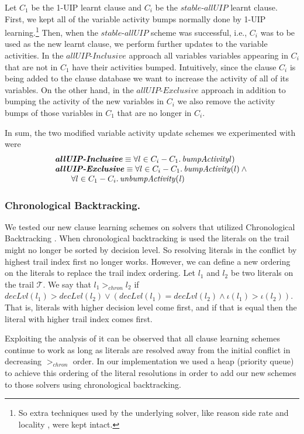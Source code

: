 \documentclass[runningheads]{llncs}
\newcommand{\allUip}{\textit{stable-allUIP}}
\newcommand{\allUipIn}{\textit{allUIP-Inclusive}}
\newcommand{\allUipEx}{\textit{allUIP-Exclusive}}
\newcommand{\trail}{\ensuremath{\mathcal{T}}}
\newcommand{\trailIdx}[1]{\ensuremath{\iota(#1)}}
\newcommand{\dlevel}[1]{\ensuremath{\mathit{decLvl}(#1)}}
\begin{document}
Let $C_1$ be the 1-UIP learnt clause and $C_i$ be the $\allUip$ learnt
clause. First, we kept all of the variable activity bumps normally
done by 1-UIP learning.\footnote{So extra techniques used by the
  underlying solver, like reason side rate and locality
  \cite{DBLP:conf/sat/LiangGPC16}, were kept intact.}  Then, when the
$\allUip$ scheme was successful, i.e., $C_i$ was to be used as the new
learnt clause, we perform further updates to the variable
activities. In the $\allUipIn$ approach all variables variables
appearing in $C_i$ that are not in $C_1$ have their activities
bumped. Intuitively, since the clause $C_i$ is being added to the
clause database we want to increase the activity of all of its
variables. On the other hand, in the $\allUipEx$ approach in addition
to bumping the activity of the new variables in $C_i$ we also remove
the activity bumps of those variables in $C_1$ that are no longer in
$C_i$.

In sum, the two modified variable activity update schemes we
experimented with were
\[
    \begin{array}{l}
    \textbf{\allUipIn} \equiv \forall l\in C_i - C_1.\,\mathit{bumpActivity}l) \\
    \textbf{\allUipEx} \equiv \forall l\in C_i - C_1.\,\mathit{bumpActivity}(l) \land\mbox{} \\
    \qquad \forall l\in C_1 - C_i.\,\mathit{unbumpActivity(l)}
  \end{array}
\]

\subsubsection{Chronological Backtracking.}
We tested our new clause learning schemes on solvers that utilized
Chronological Backtracking
\cite{DBLP:conf/sat/NadelR18,DBLP:conf/sat/MohleB19}. When
chronological backtracking is used the literals on the trail might no
longer be sorted by decision level. So resolving literals in the
conflict by highest trail index first no longer works. However, we can
define a new ordering on the literals to replace the trail index
ordering. Let $l_1$ and $l_2$ be two literals on the trail
$\trail$. We say that $l_1 >_{\mathit{chron}} l_2$ if
$\dlevel{l_1} > \dlevel{l_2} \lor (\dlevel{l_1} = \dlevel{l_2} \land
\trailIdx{l_1} > \trailIdx{l_2})$. That is, literals with higher
decision level come first, and if that is equal then the literal with
higher trail index comes first.

Exploiting the analysis of \cite{DBLP:conf/sat/MohleB19} it can be
observed that all clause learning schemes continue to work as long as
literals are resolved away from the initial conflict in decreasing
$>_{\mathit{chron}}$ order. In our implementation we used a heap
(priority queue) to achieve this ordering of the literal resolutions
in order to add our new schemes to those solvers using chronological
backtracking.
\end{document}
